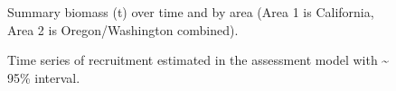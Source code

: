 \documentclass[
]{scrartcl}
\begin{document}
\begin{figure}


\caption{\label{fig-summbio}Summary biomass (t) over time and by area
(Area 1 is California, Area 2 is Oregon/Washington combined).}

\end{figure}%

\clearpage

\begin{figure}


\caption{\label{fig-tsrecuits}Time series of recruitment estimated in
the assessment model with \textasciitilde{} 95\% interval.}

\end{figure}%
\end{document}

